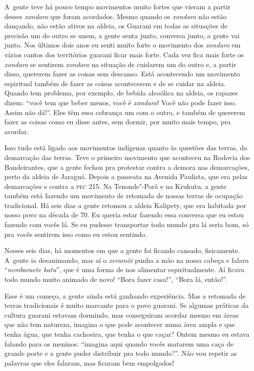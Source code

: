 A~gente teve há pouco tempo movimentos muito fortes que vieram a partir
desses \emph{xondaro} que foram acordados. Mesmo quando os \emph{xondaro} não estão
dançando, não estão ativos na aldeia, os Guarani em todas as situações
de precisão um do outro se unem, a gente senta junto, conversa junto, a
gente vai junto. Nos últimos dois anos eu senti muito forte o movimento
dos \emph{xondaro} em vários cantos dos territórios guarani ficar mais forte.
Cada vez fica mais forte os \emph{xondaro} se sentirem \emph{xondaro} na situação de
cuidarem um do outro e, a partir disso, quererem fazer as coisas sem
descanso. Está acontecendo um movimento espiritual também de fazer as
coisas acontecerem e de se cuidar na aldeia. Quando tem problema, por
exemplo, de bebida alcoólica na aldeia, os rapazes dizem: ``você tem que
beber menos, você é \emph{xondaro}! Você não pode fazer isso. Assim não dá!''.
Eles têm essa cobrança um com o outro, e também de quererem fazer as
coisas como eu disse antes, sem dormir, por muito mais tempo, pra
acordar.

Isso tudo está ligado aos movimentos indígenas quanto às questões das
terras, da demarcação das terras. Teve o primeiro movimento que
aconteceu na Rodovia dos Bandeirantes, que a gente fechou pra protestar
contra a demora nas demarcações, perto da aldeia de Jaraguá. Depois a
passeata na Avenida Paulista, que era pelas demarcações e contra a \textsc{pec}
215. Na Tenonde"-Porã e na Krukutu, a gente também está fazendo um
movimento de retomada de nossas terras de ocupação tradicional. Há seis
dias a gente retomou a aldeia Kalipety, que era habitada por nosso povo
na década de 70. Eu queria estar fazendo essa conversa que eu estou
fazendo com vocês lá. Se eu pudesse transportar todo mundo pra lá seria
bom, só pra vocês sentirem isso como eu estou sentindo.

Nesses seis dias, há momentos em que a gente foi ficando cansado,
fisicamente. A~gente ia desanimando, mas aí o \emph{xeramõi} punha a mão na
nossa cabeça e falava ``\emph{nembaraete katu}'', que é uma forma de nos
alimentar espiritualmente. Aí ficava todo mundo muito animado de novo!
``Bora fazer casa!'', ``Bora lá, então!''. 

Esse é um começo, a gente ainda está ganhando experiência. Mas a
retomada de terras tradicionais é muito marcante para o povo guarani.
Se algumas práticas da cultura guarani estavam dormindo, mas
conseguiram acordar mesmo em áreas que não tem natureza, imagina o que
pode acontecer numa área ampla e que tenha água, que tenha cachoeira,
que tenha o que caçar? Ontem mesmo eu estava falando para os meninos:
``imagina aqui quando vocês matarem uma caça de grande porte e a gente
puder distribuir pra todo mundo?''. Não vou repetir as palavras que eles
falaram, mas ficaram bem empolgados!

